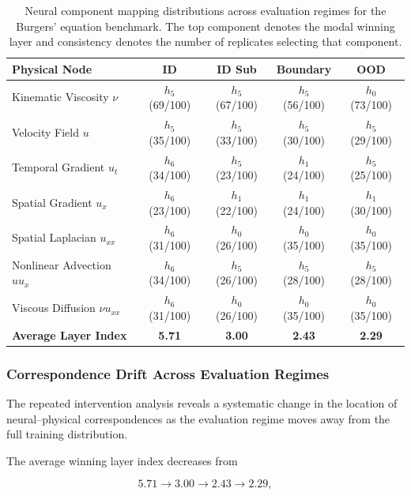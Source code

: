 \documentclass[12pt,singleside,a4paper]{article}
\begin{document}
\begin{table}[htbp]
\centering
\caption{Neural component mapping distributions across evaluation
regimes for the Burgers' equation benchmark. The top component denotes
the modal winning layer and consistency denotes the number of
replicates selecting that component.}
\label{tab:phase3_mapping}
\begin{tabular}{lcccc}
\hline
\textbf{Physical Node}
&
\textbf{ID}
&
\textbf{ID Sub}
&
\textbf{Boundary}
&
\textbf{OOD}
\\
\hline
Kinematic Viscosity $\nu$
& $h_5$ (69/100)
& $h_5$ (67/100)
& $h_5$ (56/100)
& $h_0$ (73/100)
\\
Velocity Field $u$
& $h_5$ (35/100)
& $h_5$ (33/100)
& $h_5$ (30/100)
& $h_5$ (29/100)
\\
Temporal Gradient $u_t$
& $h_6$ (34/100)
& $h_5$ (23/100)
& $h_1$ (24/100)
& $h_5$ (25/100)
\\
Spatial Gradient $u_x$
& $h_6$ (23/100)
& $h_1$ (22/100)
& $h_1$ (24/100)
& $h_1$ (30/100)
\\
Spatial Laplacian $u_{xx}$
& $h_6$ (31/100)
& $h_0$ (26/100)
& $h_0$ (35/100)
& $h_0$ (35/100)
\\
Nonlinear Advection $uu_x$
& $h_6$ (34/100)
& $h_5$ (26/100)
& $h_5$ (28/100)
& $h_5$ (28/100)
\\
Viscous Diffusion $\nu u_{xx}$
& $h_6$ (31/100)
& $h_0$ (26/100)
& $h_0$ (35/100)
& $h_0$ (35/100)
\\
\hline
\textbf{Average Layer Index}
& \textbf{5.71}
& \textbf{3.00}
& \textbf{2.43}
& \textbf{2.29}
\\
\hline
\end{tabular}
\end{table}


\subsubsection{Correspondence Drift Across Evaluation Regimes}

The repeated intervention analysis reveals a systematic change in the
location of neural--physical correspondences as the evaluation regime
moves away from the full training distribution.

The average winning layer index decreases from

\begin{equation}
    5.71
    \rightarrow
    3.00
    \rightarrow
    2.43
    \rightarrow
    2.29,
\end{equation}
\end{document}
